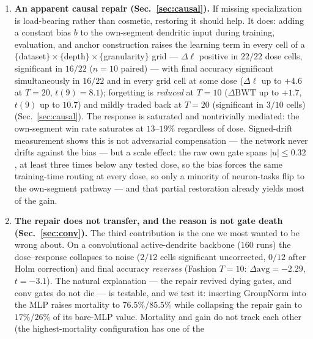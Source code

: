 \documentclass[review,12pt,number]{elsarticle}
\begin{document}
\begin{enumerate}
      dominance by argmax over segment activations \emph{and} does not filter
      inactive units is at risk of the same artifact; we did not audit the
      instrumentation used in other work on this architecture.
\item \textbf{An apparent causal repair (Sec.~\ref{sec:causal}).} If missing
      specialization is load-bearing rather than cosmetic, restoring it
      should help. It does: adding a constant bias $b$ to the own-segment
      dendritic input during training, evaluation, and anchor
      construction raises the learning term in every cell of a
      $\{$dataset$\}\times\{$depth$\}\times\{$granularity$\}$ grid ---
      $\Delta\ell$ positive in $22/22$ dose cells, significant in $16/22$
      ($n{=}10$ paired) --- with final accuracy significant simultaneously
      in $16/22$ and in every grid cell at some dose ($\Delta\ell$ up to
      $+4.6$ at $T{=}20$, $t(9){=}8.1$); forgetting is \emph{reduced} at
      $T{=}10$ ($\Delta\mathrm{BWT}$ up to $+1.7$, $t(9)$ up to $10.7$) and
      mildly traded back at $T{=}20$ (significant in $3/10$ cells)
      (Sec.~\ref{sec:causal}). The response is saturated and nontrivially
      mediated: the own-segment win rate saturates at $13$--$19\%$
      regardless of dose. Signed-drift measurement shows this is not
      adversarial compensation --- the network never drifts against the bias
      --- but a scale effect: the raw own gate spans $|u| \le 0.32$, at least
      three times below any tested dose, so the bias forces the same
      training-time routing at every dose, so only a minority of neuron-tasks
      flip to the own-segment pathway --- and that partial restoration
      already yields most of the gain.
\item \textbf{The repair does not transfer, and the reason is not gate death
      (Sec.~\ref{sec:conv}).} The third contribution is the one we most
      wanted to be wrong about. On a convolutional active-dendrite backbone
      ($160$ runs) the dose--response collapses to noise ($2/12$ cells
significant uncorrected, $0/12$ after Holm correction) and final accuracy \emph{reverses} (Fashion $T{=}10$:
      $\Delta\mathrm{avg}=-2.29$, $t{=}-3.1$). The natural explanation ---
      the repair revived dying gates, and conv gates do not die --- is
      testable, and we test it: inserting GroupNorm into the MLP raises
      mortality to $76.5\%$/$85.5\%$ while collapsing the repair gain to
      $17\%$/$26\%$ of its bare-MLP value. Mortality and gain
      do not track each other (the highest-mortality configuration has one of the

\end{enumerate}
\end{document}
